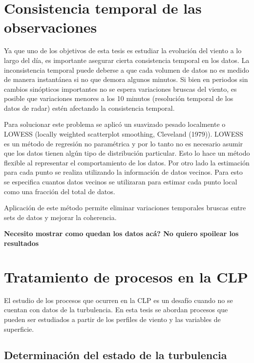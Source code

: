 \documentclass[12pt,spanish,oneside]{book}
\begin{document}
\section{Consistencia temporal de las
observaciones}\label{consistencia-temporal-de-las-observaciones}

Ya que uno de los objetivos de esta tesis es estudiar la evolución del
viento a lo largo del día, es importante asegurar cierta consistencia
temporal en los datos. La inconsistencia temporal puede deberse a que
cada volumen de datos no es medido de manera instantánea si no que
demora algunos minutos. Si bien en periodos sin cambios sinópticos
importantes no se espera variaciones bruscas del viento, es posible que
variaciones menores a los 10 minutos (resolución temporal de los datos
de radar) estén afectando la consistencia temporal.

Para solucionar este problema se aplicó un suavizado pesado localmente o
LOWESS (locally weighted scatterplot smoothing, Cleveland (1979)).
LOWESS es un método de regresión no paramétrica y por lo tanto no es
necesario asumir que los datos tienen algún tipo de distribución
particular. Esto lo hace un método flexible al representar el
comportamiento de los datos. Por otro lado la estimación para cada punto
se realiza utilizando la información de datos vecinos. Para esto se
especifica cuantos datos vecinos se utilizaran para estimar cada punto
local como una fracción del total de datos.

Aplicación de este método permite eliminar variaciones temporales
bruscas entre sets de datos y mejorar la coherencia.

\textbf{Necesito mostrar como quedan los datos acá? No quiero spoilear
los resultados}

\section{Tratamiento de procesos en la
CLP}\label{tratamiento-de-procesos-en-la-clp}

El estudio de los procesos que ocurren en la CLP es un desafío cuando no
se cuentan con datos de la turbulencia. En esta tesis se abordan
procesos que pueden ser estudiados a partir de los perfiles de viento y
las variables de superficie.

\subsection{Determinación del estado de la
turbulencia}\label{determinacion-del-estado-de-la-turbulencia}
\end{document}

